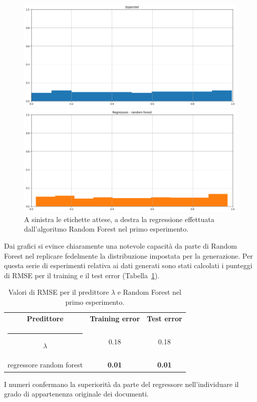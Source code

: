 \documentclass[12pt]{report}
\makeatletter
\theoremstyle{definition}
\newcommand{\thickhline}{%
    \noalign {\ifnum 0=`}\fi \hrule height 1pt
    \futurelet \reserved@a \@xhline
}
\makeatother
\begin{document}
\begin{figure}
\centering
    \begin{minipage}{0.48\textwidth}
        \includegraphics[width=\linewidth]{images/experiment_uniform_disgiunti/expected_memberships.png}
    \end{minipage}
    \begin{minipage}{0.48\textwidth}
        \includegraphics[width=\linewidth]{images/experiment_uniform_disgiunti/prediction_regression_rf.png}
    \end{minipage}
    \caption{A sinistra le etichette attese, a destra la regressione effettuata dall'algoritmo Random Forest nel primo esperimento.}
    \label{rf_exp1}
\end{figure} 
Dai grafici si evince chiaramente una notevole capacità da parte di Random Forest nel replicare fedelmente la distribuzione impostata per la generazione.
Per questa serie di esperimenti relativa ai dati generati sono stati calcolati i punteggi di RMSE per il training e il test error (Tabella~\ref{rmse_exp1}). 
\begin{table}
\centering
\begin{adjustbox}{max width=\textwidth}
 \begin{tabular}{|c|c|c|} 
 \hline
\textbf{Predittore} & \textbf{Training error} & \textbf{Test error}
\\ [0.5ex] 
 \thickhline
 $\lambda$ & 0.18 & 0.18 \\
 regressore random forest & \textbf{0.01} & \textbf{0.01}
 \\
 \hline
\end{tabular}
\end{adjustbox}
\caption{Valori di RMSE per il predittore $\lambda$ e Random Forest nel primo esperimento.}
\label{rmse_exp1}
\end{table}
I numeri confermano la superiorità da parte del regressore nell'individuare il grado di appartenenza originale dei documenti.
\end{document}
